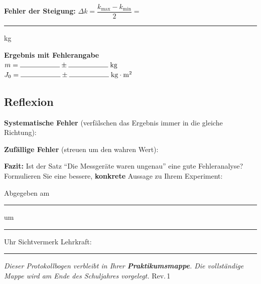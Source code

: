 \documentclass[11pt,a4paper]{scrartcl}
\begin{document}
\vspace{0.3cm}
\textbf{Fehler der Steigung:} $\Delta k = \dfrac{k_\text{max} - k_\text{min}}{2} = $ \rule{3cm}{0.4pt} kg

\vspace{0.5cm}
\begin{tcolorbox}[colback=yellow!10!white, colframe=yellow!50!black, width=\textwidth]
	\centering
	\textbf{Ergebnis mit Fehlerangabe}\\[0.3cm]
	{\Large $m = \rule{2cm}{0.4pt} \pm \rule{2cm}{0.4pt}\;\text{kg}$}\\[0.3cm]
	{\Large $J_0 = \rule{2cm}{0.4pt} \pm \rule{2cm}{0.4pt}\;\text{kg}\cdot\text{m}^2$}
\end{tcolorbox}

\subsection*{Reflexion}

\textbf{Systematische Fehler} (verfälschen das Ergebnis immer in die gleiche Richtung):

\vspace{2cm}

\textbf{Zufällige Fehler} (streuen um den wahren Wert):

\vspace{2cm}

\textbf{Fazit:} Ist der Satz ``Die Messgeräte waren ungenau'' eine gute Fehleranalyse? Formulieren Sie eine bessere, \textbf{konkrete} Aussage zu Ihrem Experiment:

\vspace{2.5cm}


	\vspace{0.4cm}
	\begin{tcolorbox}[colback=yellow!8, colframe=black, boxrule=0.6pt, title={\faIcon{check-circle}\enspace Abgabevermerk -- wird vor Ort ausgefüllt}, fonttitle=\bfseries]
		Abgegeben am \rule{2.8cm}{0.4pt} \enspace um \rule{2cm}{0.4pt} Uhr \hfill Sichtvermerk Lehrkraft: \rule{3.5cm}{0.4pt}

		\vspace{0.15cm}
		{\small\textit{Dieser Protokollbogen verbleibt in Ihrer \textbf{Praktikumsmappe}. Die vollständige Mappe wird am Ende des Schuljahres vorgelegt.} \hfill \scriptsize Rev.\,1}
	\end{tcolorbox}
\end{document}

